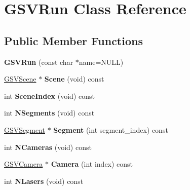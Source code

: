 \hypertarget{class_g_s_v_run}{}\section{G\+S\+V\+Run Class Reference}
\label{class_g_s_v_run}
\subsection*{Public Member Functions}
\begin{DoxyCompactItemize}
\item 
{\bfseries G\+S\+V\+Run} (const char $\ast$name=N\+U\+LL)\hypertarget{class_g_s_v_run_ac22793831e560f3c83c019a2451be01d}{}\label{class_g_s_v_run_ac22793831e560f3c83c019a2451be01d}

\item 
\hyperlink{class_g_s_v_scene}{G\+S\+V\+Scene} $\ast$ {\bfseries Scene} (void) const \hypertarget{class_g_s_v_run_af28052620e0bdcb553d583e920110214}{}\label{class_g_s_v_run_af28052620e0bdcb553d583e920110214}

\item 
int {\bfseries Scene\+Index} (void) const \hypertarget{class_g_s_v_run_a8662d1650d4448f58af71ebc3e1982f7}{}\label{class_g_s_v_run_a8662d1650d4448f58af71ebc3e1982f7}

\item 
int {\bfseries N\+Segments} (void) const \hypertarget{class_g_s_v_run_a80533a17968821897c8237cd6b0c9f40}{}\label{class_g_s_v_run_a80533a17968821897c8237cd6b0c9f40}

\item 
\hyperlink{class_g_s_v_segment}{G\+S\+V\+Segment} $\ast$ {\bfseries Segment} (int segment\+\_\+index) const \hypertarget{class_g_s_v_run_af66bb48cce46ac88d2116b4da3f350d9}{}\label{class_g_s_v_run_af66bb48cce46ac88d2116b4da3f350d9}

\item 
int {\bfseries N\+Cameras} (void) const \hypertarget{class_g_s_v_run_a73485909ac78226625208fa7dbebdecb}{}\label{class_g_s_v_run_a73485909ac78226625208fa7dbebdecb}

\item 
\hyperlink{class_g_s_v_camera}{G\+S\+V\+Camera} $\ast$ {\bfseries Camera} (int index) const \hypertarget{class_g_s_v_run_aedb825ba60bd68a048e25d88fc6c6910}{}\label{class_g_s_v_run_aedb825ba60bd68a048e25d88fc6c6910}

\item 
int {\bfseries N\+Lasers} (void) const \hypertarget{class_g_s_v_run_a745fe72cfc5a17293a71c327ffdad3ee}{}\label{class_g_s_v_run_a745fe72cfc5a17293a71c327ffdad3ee}


\end{DoxyCompactItemize}
